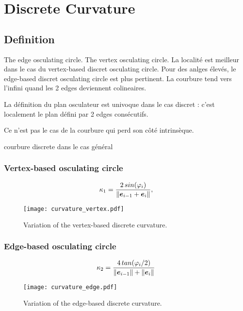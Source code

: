 \section{Discrete Curvature}

\subsection{Definition}

\cite{Hoffmann2008}

The edge osculating circle.
The vertex osculating circle.
La localité est meilleur dans le cas du vertex-based discret osculating circle.
Pour des anlges élevés, le edge-based discret osculating circle est plus pertinent.
La courbure tend vers l'infini quand les 2 edges deviennent colineaires.

La définition du plan osculateur est univoque dans le cas discret : c'est localement le plan défini par 2 edges consécutifs.

Ce n'est pas le cas de la courbure qui perd son côté intrinsèque.

courbure discrete dans le cas général

\subsubsection{Vertex-based osculating circle}

\begin{equation}
	\kappa_1 = \frac{2 \,sin(\varphi_i)}{\|\boldsymbol{e}_{i-1} + \boldsymbol{e}_{i} \|},
\end{equation}

\begin{figure}[]
\begin{center}
\texttt{[image: curvature\_vertex.pdf]}
\caption{Variation of the vertex-based discrete curvature.}
\label{fig:1_1}
\end{center}
\end{figure}

\subsubsection{Edge-based osculating circle}

\begin{equation}
	\kappa_2 = \frac{4 \,tan(\varphi_i/2)}{\|\boldsymbol{e}_{i-1}\| + \|\boldsymbol{e}_{i} \|}
\end{equation}

\begin{figure}[]
\begin{center}
\texttt{[image: curvature\_edge.pdf]}
\caption{Variation of the edge-based discrete curvature.}
\label{fig:1_1}
\end{center}
\end{figure}



